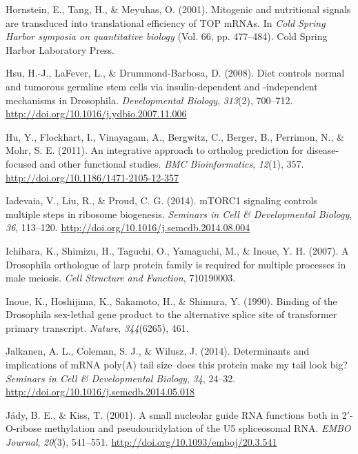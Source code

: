 \documentclass[12pt,oneside]{reedthesis}
\newlength{\cslhangindent}
\newenvironment{cslreferences}%
  {\setlength{\parindent}{0pt}%
  \everypar{\setlength{\hangindent}{\cslhangindent}}\ignorespaces}%
  {\par}
\begin{document}
\begin{cslreferences}
\leavevmode\hypertarget{ref-Hornstein2001a}{}%
Hornstein, E., Tang, H., \& Meyuhas, O. (2001). Mitogenic and nutritional signals are transduced into translational efficiency of TOP mRNAs. In \emph{Cold Spring Harbor symposia on quantitative biology} (Vol. 66, pp. 477--484). Cold Spring Harbor Laboratory Press.

\leavevmode\hypertarget{ref-hsuDietControlsNormal2008}{}%
Hsu, H.-J., LaFever, L., \& Drummond-Barbosa, D. (2008). Diet controls normal and tumorous germline stem cells via insulin-dependent and -independent mechanisms in Drosophila. \emph{Developmental Biology}, \emph{313}(2), 700--712. \url{http://doi.org/10.1016/j.ydbio.2007.11.006}

\leavevmode\hypertarget{ref-huIntegrativeApproachOrtholog2011}{}%
Hu, Y., Flockhart, I., Vinayagam, A., Bergwitz, C., Berger, B., Perrimon, N., \& Mohr, S. E. (2011). An integrative approach to ortholog prediction for disease-focused and other functional studies. \emph{BMC Bioinformatics}, \emph{12}(1), 357. \url{http://doi.org/10.1186/1471-2105-12-357}

\leavevmode\hypertarget{ref-iadevaiaMTORC1SignalingControls2014}{}%
Iadevaia, V., Liu, R., \& Proud, C. G. (2014). mTORC1 signaling controls multiple steps in ribosome biogenesis. \emph{Seminars in Cell \& Developmental Biology}, \emph{36}, 113--120. \url{http://doi.org/10.1016/j.semcdb.2014.08.004}

\leavevmode\hypertarget{ref-Ichihara2007a}{}%
Ichihara, K., Shimizu, H., Taguchi, O., Yamaguchi, M., \& Inoue, Y. H. (2007). A Drosophila orthologue of larp protein family is required for multiple processes in male meiosis. \emph{Cell Structure and Function}, 710190003.

\leavevmode\hypertarget{ref-Inoue1990}{}%
Inoue, K., Hoshijima, K., Sakamoto, H., \& Shimura, Y. (1990). Binding of the Drosophila sex-lethal gene product to the alternative splice site of transformer primary transcript. \emph{Nature}, \emph{344}(6265), 461.

\leavevmode\hypertarget{ref-Jalkanen2014h}{}%
Jalkanen, A. L., Coleman, S. J., \& Wilusz, J. (2014). Determinants and implications of mRNA poly(A) tail size--does this protein make my tail look big? \emph{Seminars in Cell \& Developmental Biology}, \emph{34}, 24--32. \url{http://doi.org/10.1016/j.semcdb.2014.05.018}

\leavevmode\hypertarget{ref-Jady2001c}{}%
Jády, B. E., \& Kiss, T. (2001). A small nucleolar guide RNA functions both in 2\({'}\)-O-ribose methylation and pseudouridylation of the U5 spliceosomal RNA. \emph{EMBO Journal}, \emph{20}(3), 541--551. \url{http://doi.org/10.1093/emboj/20.3.541}


\end{cslreferences}
\end{document}
